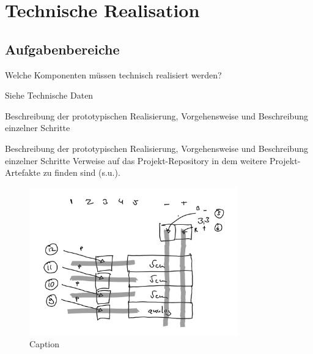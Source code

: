\chapter{Technische Realisation}

\section{Aufgabenbereiche}

    Welche Komponenten müssen technisch realisiert werden? 


    Siehe Technische Daten

    Beschreibung der prototypischen Realisierung, Vorgehensweise und
    Beschreibung einzelner Schritte


    Beschreibung der prototypischen Realisierung, Vorgehensweise und Beschreibung einzelner Schritte
    Verweise auf das Projekt-Repository in dem weitere Projekt-Artefakte zu finden sind (s.u.).

    \begin{figure}[h]
        \begin{center}
            \includegraphics[width=9cm]{media/03_technical_implementation/header_1.png}
        \end{center}
        \caption{Caption}
        \label{fig:header_1}
    \end{figure}

